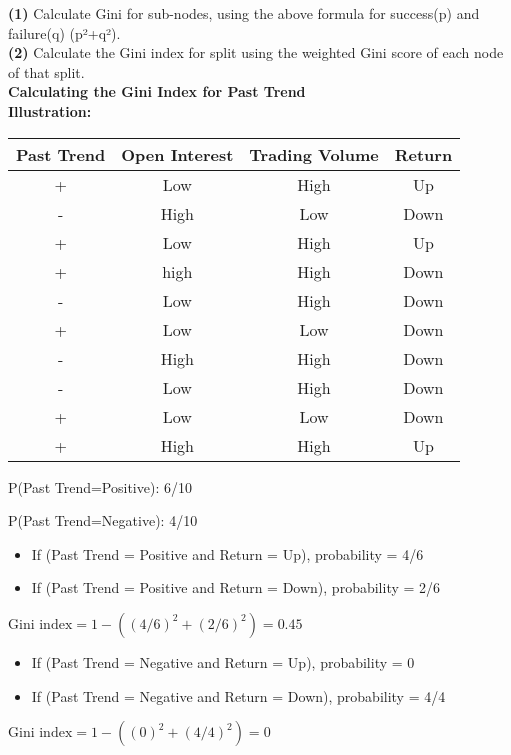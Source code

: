 \documentclass[a4paper, 11pt]{article}
\begin{document}
\textbf{(1)} Calculate Gini for sub-nodes, using the above formula for success(p) and failure(q) (p²+q²). \\
\textbf{(2) }Calculate the Gini index for split using the weighted Gini score of each node of that split.\\
\textbf{Calculating the Gini Index for Past Trend}\\
\textbf{Illustration:}  \\
\begin{center}
    \begin{tabular}{||c c c c||} 
     \hline
     Past Trend & Open Interest & Trading Volume & Return \\ [0.5ex] 
     \hline\hline
     + & Low & High & Up \\ 
     \hline
     - & High & Low & Down \\
     \hline
     + & Low & High & Up\\
     \hline
     + & high & High & Down \\
     \hline
     - & Low & High & Down \\ 
     \hline
     + & Low & Low & Down \\
     \hline
     - & High & High & Down \\
     \hline
     - & Low & High & Down\\
     \hline
     + & Low & Low & Down\\
     \hline
     + & High & High & Up \\[1ex] 
     \hline
    \end{tabular}
    \end{center}


P(Past Trend=Positive): 6/10

P(Past Trend=Negative): 4/10
\begin{itemize}
\item If (Past Trend = Positive and Return = Up), probability = 4/6
\item If (Past Trend = Positive and Return = Down), probability = 2/6
\end{itemize}

$\text{Gini index} = 1 - ((4/6)^2 + (2/6)^2) = 0.45$

\begin{itemize}
\item If (Past Trend = Negative and Return = Up), probability = 0
\item If (Past Trend = Negative and Return = Down), probability = 4/4
\end{itemize}
$\text{Gini index} = 1 - ((0)^2 + (4/4)^2) = 0$
\end{document}
